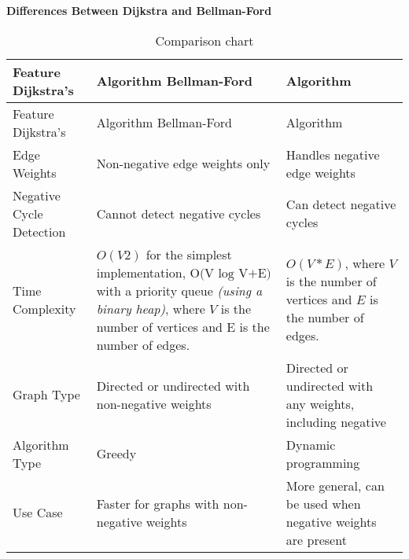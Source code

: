 \documentclass[
  letterpaper,
  DIV=11,
  numbers=noendperiod]{scrreprt}
\begin{document}
\begin{tcolorbox}[enhanced jigsaw, colframe=quarto-callout-note-color-frame, toprule=.15mm, bottomrule=.15mm, rightrule=.15mm, colback=white, breakable, arc=.35mm, opacityback=0, left=2mm, leftrule=.75mm]

\vspace{-3mm}\textbf{Differences Between Dijkstra and Bellman-Ford}\vspace{3mm}

\begin{longtable}[]{@{}
  >{\raggedright\arraybackslash}p{}
  >{\raggedleft\arraybackslash}p{}
  >{\centering\arraybackslash}p{}@{}}
\caption{Comparison chart}\tabularnewline
\toprule\noalign{}
\begin{minipage}[b]{\linewidth}\raggedright
Feature Dijkstra's
\end{minipage} & \begin{minipage}[b]{\linewidth}\raggedleft
Algorithm Bellman-Ford
\end{minipage} & \begin{minipage}[b]{\linewidth}\centering
Algorithm
\end{minipage} \\
\midrule\noalign{}
\endfirsthead
\toprule\noalign{}
\begin{minipage}[b]{\linewidth}\raggedright
Feature Dijkstra's
\end{minipage} & \begin{minipage}[b]{\linewidth}\raggedleft
Algorithm Bellman-Ford
\end{minipage} & \begin{minipage}[b]{\linewidth}\centering
Algorithm
\end{minipage} \\
\midrule\noalign{}
\endhead
\bottomrule\noalign{}
\endlastfoot
Edge Weights & Non-negative edge weights only & Handles negative edge
weights \\
Negative Cycle Detection & Cannot detect negative cycles & Can detect
negative cycles \\
Time Complexity & \(O(V2)\) for the simplest implementation,
\(\text{O(V log V+E)}\) with a priority queue \emph{(using a binary
heap)}, where \(V\) is the number of vertices and E is the number of
edges. & \(O(V*E)\), where \(V\) is the number of vertices and \(E\) is
the number of edges. \\
Graph Type & Directed or undirected with non-negative weights & Directed
or undirected with any weights, including negative \\
Algorithm Type & Greedy & Dynamic programming \\
Use Case & Faster for graphs with non-negative weights & More general,
can be used when negative weights are present \\
\end{longtable}

\end{tcolorbox}
\end{document}
